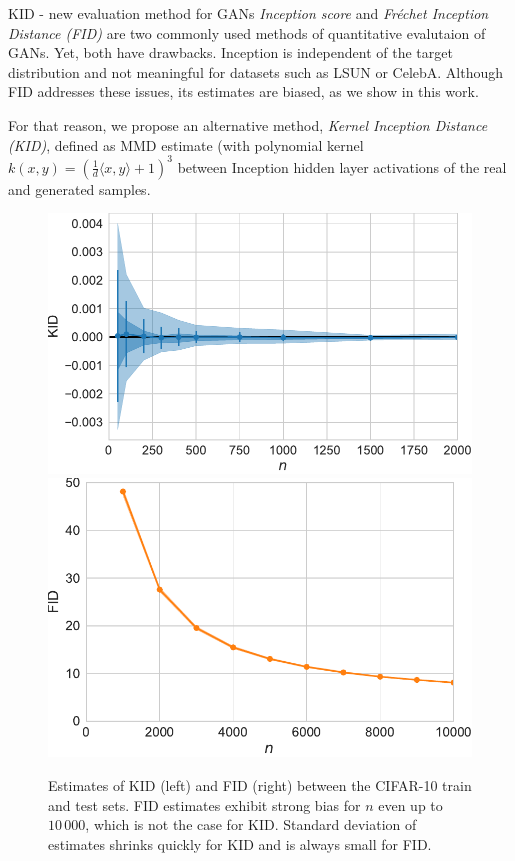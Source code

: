 \documentclass[xcolor={table}]{beamer}
\begin{document}
\begin{frame}{}
\begin{columns}[T, totalwidth=\textwidth]
  \begin{column}{.32\textwidth}
    \begin{block}{KID - new evaluation method for GANs}
      \emph{Inception score} and \emph{Fr\'echet Inception Distance (FID)} are two commonly used methods 
      of quantitative evalutaion of GANs. Yet, both have drawbacks. Inception is 
      independent of the target distribution and not meaningful for datasets such as LSUN or CelebA.
      Although FID addresses these issues, its estimates are biased, as we show in this work.

      For that reason, we propose an alternative method, \emph{Kernel Inception Distance (KID)}, defined as 
      MMD estimate (with polynomial kernel $k(x,y) = \left(\frac{1}{d}\langle x, y\rangle + 1\right)^3$
      between Inception hidden layer activations of the real and generated samples. 
    \end{block}
    \begin{figure}
      \centering
      \includegraphics[width=.48\columnwidth]{figs/mmd-unbiased.pdf}\quad
      \includegraphics[width=.48\columnwidth]{figs/fid-bias.pdf}
      \caption{Estimates of KID (left) and FID (right) between the CIFAR-10 train and test sets. FID estimates 
        exhibit strong bias for $n$ even up to $10\,000$, which is not the case for KID. 
        Standard deviation of estimates shrinks quickly for KID and is always small for FID.}  %

\end{figure}
\end{column}
\end{columns}
\end{frame}
\end{document}
